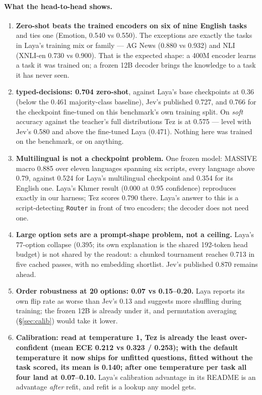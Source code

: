 \documentclass[11pt,a4paper]{article}
\newcommand{\code}[1]{\texttt{#1}}
\begin{document}
\paragraph{What the head-to-head shows.}
\begin{enumerate}[label=(\arabic*)]
\item \textbf{Zero-shot beats the trained encoders on six of nine English tasks} and ties one (Emotion, 0.540 vs 0.550). The exceptions are exactly the tasks in Laya's training mix or family --- AG News (0.880 vs 0.932) and NLI (XNLI-en 0.730 vs 0.900). That is the expected shape: a 400M encoder learns a task it was trained on; a frozen 12B decoder brings the knowledge to a task it has never seen.
\item \textbf{typed-decisions: 0.704 zero-shot}, against Laya's base checkpoints at 0.36 (below the 0.461 majority-class baseline), Jev's published 0.727, and 0.766 for the checkpoint fine-tuned on this benchmark's own training split. On \emph{soft} accuracy against the teacher's full distributions Tez is at 0.575 --- level with Jev's 0.580 and above the fine-tuned Laya (0.471). Nothing here was trained on the benchmark, or on anything.
\item \textbf{Multilingual is not a checkpoint problem.} One frozen model: MASSIVE macro 0.885 over eleven languages spanning six scripts, every language above 0.79, against 0.524 for Laya's multilingual checkpoint and 0.354 for its English one. Laya's Khmer result (0.000 at 0.95 confidence) reproduces exactly in our harness; Tez scores 0.790 there. Laya's answer to this is a script-detecting \code{Router} in front of two encoders; the decoder does not need one.
\item \textbf{Large option sets are a prompt-shape problem, not a ceiling.} Laya's 77-option collapse (0.395; its own explanation is the shared 192-token head budget) is not shared by the readout: a chunked tournament reaches 0.713 in five cached passes, with no embedding shortlist. Jev's published 0.870 remains ahead.
\item \textbf{Order robustness at 20 options: 0.07 vs 0.15--0.20.} Laya reports its own flip rate as worse than Jev's 0.13 and suggests more shuffling during training; the frozen 12B is already under it, and permutation averaging (\S\ref{sec:calib}) would take it lower.
\item \textbf{Calibration: read at temperature 1, Tez is already the least over-confident (mean ECE 0.212 vs 0.323 / 0.253); with the default temperature it now ships for unfitted questions, fitted without the task scored, its mean is 0.140; after one temperature per task all four land at 0.07--0.10.} Laya's calibration advantage in its README is an advantage \emph{after} refit, and refit is a lookup any model gets.

\end{enumerate}
\end{document}
